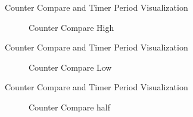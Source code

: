 
\begin{frame}{Counter Compare and Timer Period Visualization}
	\begin{figure}
		\centering
		\caption{Counter Compare High}
	\end{figure}
\end{frame}

\begin{frame}{Counter Compare and Timer Period Visualization}
	\begin{figure}
		\centering
		\caption{Counter Compare Low}
	\end{figure}
\end{frame}

\begin{frame}{Counter Compare and Timer Period Visualization}
	\begin{figure}
		\centering
		\caption{Counter Compare half}
	\end{figure}
\end{frame}


